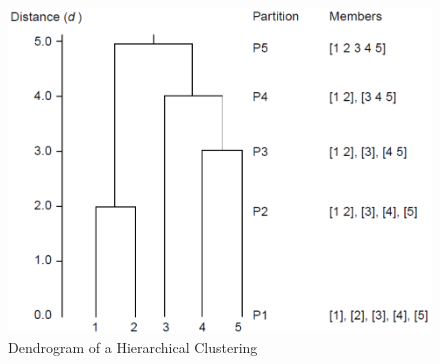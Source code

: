 \documentclass[a4paper,10pt]{article}
\theoremstyle{plain}
\theoremstyle{definition}
\begin{document}
\begin{figure}[H]
	\centering
	\includegraphics*[scale=0.3]{./pictures/hc/hc_example.png}
	\caption{Dendrogram of a Hierarchical Clustering}
	\label{fig:hc example}
\end{figure}
\end{document}
